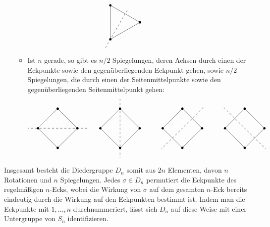 \begin{itemize}
\begin{itemize}
\[\begin{tikzpicture}
            \draw ([xshift=18em]0:1)
            \foreach \x in {120, 240, 360} {
              -- ([xshift=18em]\x:1)
            };
            \foreach \x in {120, 240, 360} {
              \fill[black] ([xshift=18em]\x:1) circle (0.06);
            }
            \draw[dashed] ([xshift=18em]240:1.5) -- ([xshift=18em]60:0.8);
          \end{tikzpicture}
          \hspace{5em}
        \]
      \item
        Ist $n$ gerade, so gibt es $n/2$ Spiegelungen, deren Achsen durch einen der Eckpunkte sowie den gegenüberliegenden Eckpunkt gehen, sowie $n/2$ Spiegelungen, die durch einen der Seitenmittelpunkte sowie den gegenüberliegenden Seitenmittelpunkt gehen:
        \[
          \begin{tikzpicture}
            \draw (0:1)
            \foreach \x in {90, 180, 270, 360} {
              -- (\x:1)
            };
            \foreach \x in {90, 180, 270, 360} {
              \fill[black] (\x:1) circle (0.06);
            }
            \draw[dashed] (0:1.5) -- (180:1.5);
            \draw ([xshift=9em]0:1)
            \foreach \x in {90, 180, 270, 360} {
              -- ([xshift=9em]\x:1)
            };
            \foreach \x in {90, 180, 270, 360} {
              \fill[black] ([xshift=9em]\x:1) circle (0.06);
            }
            \draw[dashed] ([xshift=9em]90:1.5) -- ([xshift=9em]270:1.5);
            \draw ([xshift=27em]0:1)
            \foreach \x in {90, 180, 270, 360} {
              -- ([xshift=27em]\x:1)
            };
            \foreach \x in {90, 180, 270, 360} {
              \fill[black] ([xshift=27em]\x:1) circle (0.06);
            }
            \draw[dashed] ([xshift=27em]135:1.5) -- ([xshift=27em]315:1.5);
            \draw ([xshift=18em]0:1)
            \foreach \x in {90, 180, 270, 360} {
              -- ([xshift=18em]\x:1)
            };
            \foreach \x in {90, 180, 270, 360} {
              \fill[black] ([xshift=18em]\x:1) circle (0.06);
            }
            \draw[dashed] ([xshift=18em]45:1.5) -- ([xshift=18em]225:1.5);
          \end{tikzpicture}
        \]
    \end{itemize}
\end{itemize}

Insgesamt besteht die Diedergruppe $D_n$ somit aus $2n$ Elementen, davon $n$ Rotationen und $n$ Spiegelungen.
Jedes $\sigma \in D_n$ permutiert die Eckpunkte des regelmäßigen $n$-Ecks, wobei die Wirkung von $\sigma$ auf dem gesamten $n$-Eck bereits eindeutig durch die Wirkung auf den Eckpunkten bestimmt ist.
Indem man die Eckpunkte mit $1, \dotsc, n$ durchnummeriert, lässt sich $D_n$ auf diese Weise mit einer Untergruppe von $S_n$ identifizieren.

